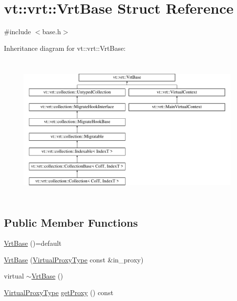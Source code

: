 \hypertarget{structvt_1_1vrt_1_1_vrt_base}{}\section{vt\+:\+:vrt\+:\+:Vrt\+Base Struct Reference}
\label{structvt_1_1vrt_1_1_vrt_base}


{\ttfamily \#include $<$base.\+h$>$}

Inheritance diagram for vt\+:\+:vrt\+:\+:Vrt\+Base\+:\begin{figure}[H]
\begin{center}
\leavevmode
\includegraphics[height=7.542088cm]{structvt_1_1vrt_1_1_vrt_base}
\end{center}
\end{figure}
\subsection*{Public Member Functions}
\begin{DoxyCompactItemize}
\item 
\hyperlink{structvt_1_1vrt_1_1_vrt_base_a5f98da4f22c55e58f5759eb84ac7cd06}{Vrt\+Base} ()=default
\item 
\hyperlink{structvt_1_1vrt_1_1_vrt_base_a7cc2b4f4ad3f2807e73b3d7a0a5b3676}{Vrt\+Base} (\hyperlink{namespacevt_a1b417dd5d684f045bb58a0ede70045ac}{Virtual\+Proxy\+Type} const \&in\+\_\+proxy)
\item 
virtual \hyperlink{structvt_1_1vrt_1_1_vrt_base_a16d15fcaabbf2e477315466dcaaa6f84}{$\sim$\+Vrt\+Base} ()
\item 
\hyperlink{namespacevt_a1b417dd5d684f045bb58a0ede70045ac}{Virtual\+Proxy\+Type} \hyperlink{structvt_1_1vrt_1_1_vrt_base_a30ea8cc8e915777f3106038c73cdb499}{get\+Proxy} () const
\end{DoxyCompactItemize}
